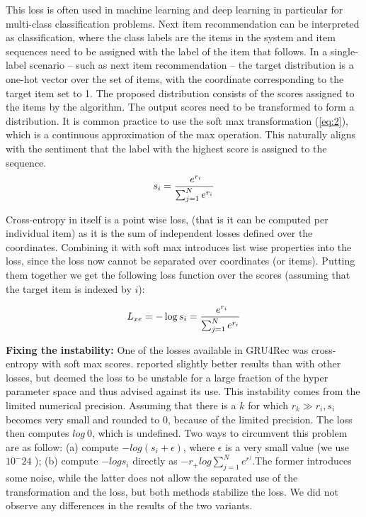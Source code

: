 \documentclass{article} %
\begin{document}
This loss is often used in machine learning and deep learning in particular for multi-class classification problems. Next item recommendation can be interpreted as classification, where the class labels are the items in the system and item sequences need to be assigned with the label of the item that follows. In a single-label scenario – such as next item recommendation – the target distribution is a one-hot vector over the set of items, with the coordinate corresponding to the target item set
to 1. The proposed distribution consists of the scores assigned to the items by the algorithm. The output scores need to be transformed to form a distribution. It is common practice to use the soft max transformation (\ref{eq:2}), which is a continuous approximation of the max operation. This naturally aligns
with the sentiment that the label with the highest score is assigned to the sequence.
\begin{equation}\label{eq:2}
    s_i = \frac{\ e^{r_i} }{\sum_{j=1}^{N} \\ e^{r_i}}
\end{equation}

Cross-entropy in itself is a point wise loss, (that is it can be computed per individual item) as it is the sum of independent losses defined over the coordinates. Combining it with soft max introduces
list wise properties into the loss, since the loss now cannot be separated over coordinates (or items). Putting them together we get the following loss function over the scores (assuming that the target
item is indexed by $i$):

\begin{equation}\label{eq:3}
    L_{xe} = - \log s_i = \frac{\ e^{r_i} }{\sum_{j=1}^{N} \\ e^{r_i}}
\end{equation}

\textbf{Fixing the instability:} One of the losses available in GRU4Rec was cross-entropy with soft max scores. \cite{hidasi2016a} reported slightly better results than with other losses, but deemed the loss to be unstable for a large fraction of the hyper parameter space and thus advised against its use. This instability comes from the limited numerical precision. Assuming that there is a $k$ for which $r_k \gg  r_i , s_i$ becomes very small and rounded to 0, because of the limited precision. The loss
then computes $log \ 0$, which is undefined. Two ways to circumvent this problem are as follow: (a)
compute $− log(s_i +\epsilon)$, where $\epsilon$ is a very small value (we use $10^−24$ ); (b) compute $− log s_i$ directly as $−r _+log \sum_{j=1}^{N} e^{ r^j }. $The former introduces some noise, while the latter does not allow the separated use of the transformation and the loss, but both methods stabilize the loss. We did not observe any differences in the results of the two variants.
\end{document}
